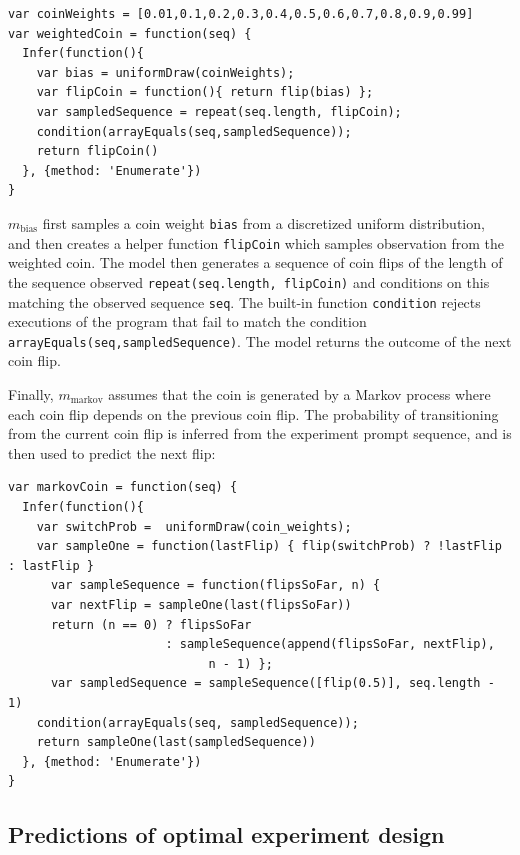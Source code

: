 \documentclass{article}
\begin{document}
\begin{lstlisting}[caption=Biased coin model,  label={lst:m_weighted}]
var coinWeights = [0.01,0.1,0.2,0.3,0.4,0.5,0.6,0.7,0.8,0.9,0.99]
var weightedCoin = function(seq) {
  Infer(function(){
    var bias = uniformDraw(coinWeights);
    var flipCoin = function(){ return flip(bias) };
    var sampledSequence = repeat(seq.length, flipCoin);
    condition(arrayEquals(seq,sampledSequence));
    return flipCoin()
  }, {method: 'Enumerate'})
}
\end{lstlisting}

$m_{\text{bias}}$ first samples a coin weight \lstinline{bias} from a discretized uniform distribution, and
then creates a helper function \lstinline{flipCoin} which samples observation from the weighted coin.
The model then generates a sequence of coin flips of the length of the sequence observed \lstinline{repeat(seq.length, flipCoin)} and conditions on this matching the observed sequence \lstinline{seq}.
The built-in function \lstinline{condition} rejects executions of the program that fail to match the condition \lstinline{arrayEquals(seq,sampledSequence)}.
The model returns the outcome of the next coin flip.

Finally, $m_{\text{markov}}$ assumes that the coin is generated by a Markov process where each coin flip depends on the previous coin flip.
The probability of transitioning from the current coin flip is inferred from the experiment prompt sequence, and is  then used to predict the next flip:

\begin{lstlisting}[caption=Markov coin model]
var markovCoin = function(seq) {
  Infer(function(){
    var switchProb =  uniformDraw(coin_weights);
    var sampleOne = function(lastFlip) { flip(switchProb) ? !lastFlip : lastFlip }
 	  var sampleSequence = function(flipsSoFar, n) {
      var nextFlip = sampleOne(last(flipsSoFar))
      return (n == 0) ? flipsSoFar
                      : sampleSequence(append(flipsSoFar, nextFlip),
                      		n - 1) };
	  var sampledSequence = sampleSequence([flip(0.5)], seq.length - 1)
    condition(arrayEquals(seq, sampledSequence));
    return sampleOne(last(sampledSequence))
  }, {method: 'Enumerate'})
}
\end{lstlisting}

\subsection{Predictions of optimal experiment design}
\end{document}
